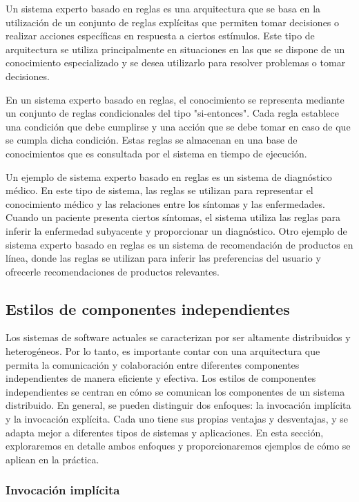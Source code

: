 \documentclass[executivepaper]{article}
\begin{document}
Un sistema experto basado en reglas es una arquitectura que se basa en la utilización de un conjunto de reglas explícitas que permiten tomar decisiones o realizar acciones específicas en respuesta a ciertos estímulos. Este tipo de arquitectura se utiliza principalmente en situaciones en las que se dispone de un conocimiento especializado y se desea utilizarlo para resolver problemas o tomar decisiones.

En un sistema experto basado en reglas, el conocimiento se representa mediante un conjunto de reglas condicionales del tipo "si-entonces". Cada regla establece una condición que debe cumplirse y una acción que se debe tomar en caso de que se cumpla dicha condición. Estas reglas se almacenan en una base de conocimientos que es consultada por el sistema en tiempo de ejecución.

Un ejemplo de sistema experto basado en reglas es un sistema de diagnóstico médico. En este tipo de sistema, las reglas se utilizan para representar el conocimiento médico y las relaciones entre los síntomas y las enfermedades. Cuando un paciente presenta ciertos síntomas, el sistema utiliza las reglas para inferir la enfermedad subyacente y proporcionar un diagnóstico. Otro ejemplo de sistema experto basado en reglas es un sistema de recomendación de productos en línea, donde las reglas se utilizan para inferir las preferencias del usuario y ofrecerle recomendaciones de productos relevantes.

\newpage
\subsection*{Estilos de componentes independientes}

Los sistemas de software actuales se caracterizan por ser altamente distribuidos y heterogéneos. Por lo tanto, es importante contar con una arquitectura que permita la comunicación y colaboración entre diferentes componentes independientes de manera eficiente y efectiva. Los estilos de componentes independientes se centran en cómo se comunican los componentes de un sistema distribuido. En general, se pueden distinguir dos enfoques: la invocación implícita y la invocación explícita. Cada uno tiene sus propias ventajas y desventajas, y se adapta mejor a diferentes tipos de sistemas y aplicaciones. En esta sección, exploraremos en detalle ambos enfoques y proporcionaremos ejemplos de cómo se aplican en la práctica.

\subsubsection*{Invocación implícita}
\end{document}
